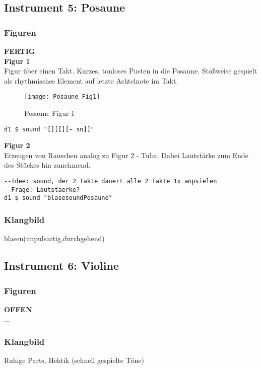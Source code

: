 \documentclass[
10pt, %
a4paper, %
oneside, %
headinclude,footinclude, %
BCOR5mm, %
]{scrartcl}
\begin{document}
\subsection{Instrument 5: Posaune}
\subsubsection{Figuren}
{\color{green}\textbf{FERTIG}} \\

\noindent\textbf{Figur 1}\\
Figur über einen Takt. Kurzes, tonloses Pusten in die Posaune. Stoßweise gespielt als rhythmisches Element auf letzte Achtelnote im Takt.\\
\begin{figure}[h]
	\centering 
	\texttt{[image: Posaune\_Fig1]} 
	\caption{Posaune Figur 1}
\end{figure}

\begin{lstlisting}
d1 $ sound "[][[][~ sn]]"
\end{lstlisting}


\noindent\textbf{Figur 2}\\
Erzeugen von Rauschen analog zu Figur 2 - Tuba. Dabei Lautstärke zum Ende des Stückes hin zunehmend.
\begin{lstlisting}
--Idee: sound, der 2 Takte dauert alle 2 Takte 1x anpsielen
--Frage: Lautstaerke?
d1 $ sound "blasesoundPosaune"
\end{lstlisting}

\subsubsection{Klangbild}
blasen(impulsartig,durchgehend)

\subsection{Instrument 6: Violine}
\subsubsection{Figuren}
{\color{red}\textbf{OFFEN}} \\
...

\subsubsection{Klangbild}
Ruhige Parts, Hektik (schnell gespielte Töne)
\end{document}
